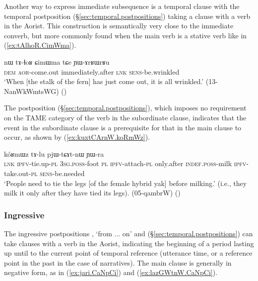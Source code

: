 Another way to express immediate subsequence is a temporal clause with the temporal postposition  (§\ref{sec:temporal.postpositions}) taking a clause with a verb in the Aorist. This construction is semantically very close to the immediate converb, but more commonly found when the main verb is a stative verb like  in (\ref{ex:tAlhoR.CimWma}).
 
\begin{exe}
\ex \label{ex:tAlhoR.CimWma} 
\gll  nɯ tɤ-ɬoʁ ɕimɯma tɕe ɲɯ-ɤrʁɯrʁu \\
\textsc{dem} \textsc{aor}-come.out immediately.after \textsc{lnk} \textsc{sens}-be.wrinkled \\
\glt  `When [the stalk of the fern] has just come out, it is all wrinkled.' (13-NanWkWmtsWG)
()
 \end{exe}  
 
 The postposition   (§\ref{sec:temporal.postpositions}), which imposes no requirement on the TAME category of the verb in the subordinate clause, indicates that the event in the subordinate clause is a prerequisite for that in the main clause to occur, as shown by (\ref{ex:kuxtCArnW.koRmWz}).
 
 \begin{exe}
\ex \label{ex:kuxtCArnW.koRmWz} 
\gll   [ɯ-mi ra ku-xtɕɤr-nɯ] kóʁmɯz tɤ-lu pjɯ-tɕɤt-nɯ ɲɯ-ra \\
 \textsc{lnk} \textsc{ipfv}-tie.up-\textsc{pl} \textsc{3sg}.\textsc{poss}-foot \textsc{pl} \textsc{ipfv}-attach-\textsc{pl} only.after \textsc{indef}.\textsc{poss}-milk \textsc{ipfv}-take.out-\textsc{pl}  \textsc{sens}-be.needed \\
\glt  `People need to tie the legs [of the female hybrid yak] before milking.' (i.e., they milk it only after they have tied its legs).   (05-qambrW)
()
  \end{exe}  
 
 
\subsubsection{Ingressive} \label{sec:since.clause} 
 The ingressive postpositions  , `from ... on' and  (§\ref{sec:temporal.postpositions}) can take clauses with a verb in the Aorist, indicating the beginning of a period lasting up until to the current point of temporal reference (utterance time, or a reference point in the past in the case of narratives). The main clause is generally in negative form, as in (\ref{ex:jari.CaNpCi}) and (\ref{ex:lazGWtnW.CaNpCi}).

